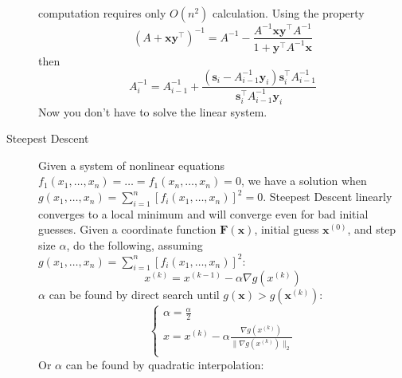 \documentclass[8pt]{article}
\begin{document}
\begin{multicols}{2}
\begin{description}
      computation requires only $O(n^2)$ calculation. Using the property
      $$\left(A+\mathbf{x}\mathbf{y}^\top\right)^{-1} = A^{-1} - \frac{A^{-1}\mathbf{x}\mathbf{y}^\top A^{-1}}{1+\mathbf{y}^\top A^{-1}\mathbf{x}}$$
      then
      $$A_i^{-1}= A_{i-1}^{-1}+\frac{(\mathbf{s}_i - A_{i-1}^{-1}\mathbf{y}_i)\mathbf{s}_i^\top A_{i-1}^{-1}}{\mathbf{s}_i^\top A_{i-1}^{-1} \mathbf{y}_i}$$
      Now you don't have to solve the linear system.
    \item[Steepest Descent] Given a system of nonlinear equations
      $f_1(x_1,\ldots,x_n)=\ldots=f_1(x_n,\ldots,x_n)=0$, we have a solution when $g(x_1,\ldots,x_n)
      = \sum_{i=1}^n[f_i(x_1,\ldots,x_n)]^2=0$. Steepest Descent linearly converges to a local
      minimum and will converge even for bad initial guesses. Given a coordinate function
      $\mathbf{F}(\mathbf{x})$, initial guess $\mathbf{x}^{(0)}$, and step size $\alpha$, do the
      following, assuming $g(x_1,\ldots,x_n) = \sum_{i=1}^n[f_i(x_1,\ldots,x_n)]^2$:
      \begin{equation*}
        x^{(k)}=x^{(k-1)}-\alpha \nabla g(x^{(k)})
      \end{equation*}
      $\alpha$ can be found by direct search until $g(\mathbf{x}) > g(\mathbf{x}^{(k)})$:
      \begin{equation*}
        \left\{
        \begin{array}{c}
          \alpha = \frac{\alpha}{2} \\
          x = x^{(k)} - \alpha \frac{\nabla g(x^{(k)})}{\|\nabla g(x^{(k)})\|_2} \\
        \end{array}
        \right.
      \end{equation*}
      Or $\alpha$ can be found by quadratic interpolation:


\end{description}
\end{multicols}
\end{document}
